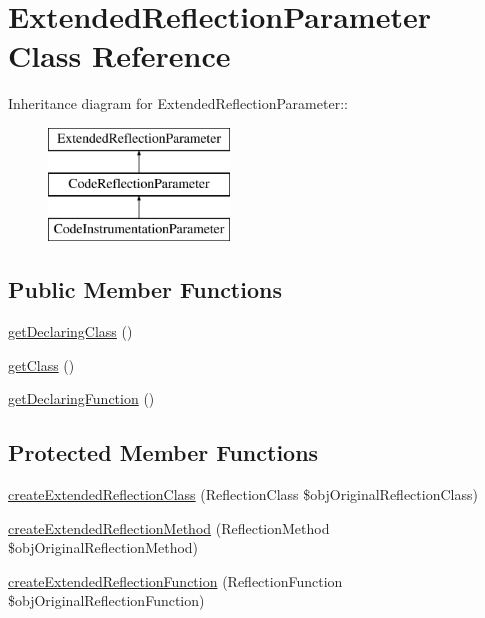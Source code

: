 \hypertarget{class_extended_reflection_parameter}{
\section{ExtendedReflectionParameter Class Reference}
\label{class_extended_reflection_parameter}
}
Inheritance diagram for ExtendedReflectionParameter::\begin{figure}[H]
\begin{center}
\leavevmode
\includegraphics[height=3cm]{class_extended_reflection_parameter}
\end{center}
\end{figure}
\subsection*{Public Member Functions}
\begin{CompactItemize}
\item 
\hyperlink{class_extended_reflection_parameter_acff3f8d93cc250281f0f73bff3422e1}{getDeclaringClass} ()
\item 
\hyperlink{class_extended_reflection_parameter_23ecbde357f7f6bde5a50f876334a74d}{getClass} ()
\item 
\hyperlink{class_extended_reflection_parameter_af67f978eb2fb55cd1835c75ab86feba}{getDeclaringFunction} ()
\end{CompactItemize}
\subsection*{Protected Member Functions}
\begin{CompactItemize}
\item 
\hyperlink{class_extended_reflection_parameter_6b56ec198bc6a5b5a72076e4e7c19e29}{createExtendedReflectionClass} (ReflectionClass \$objOriginalReflectionClass)
\item 
\hyperlink{class_extended_reflection_parameter_ec7c1d4b204b6e3a6291d3b867afb688}{createExtendedReflectionMethod} (ReflectionMethod \$objOriginalReflectionMethod)
\item 
\hyperlink{class_extended_reflection_parameter_b23ad87d3ac2f376c1a133ca6d27f031}{createExtendedReflectionFunction} (ReflectionFunction \$objOriginalReflectionFunction)
\end{CompactItemize}


